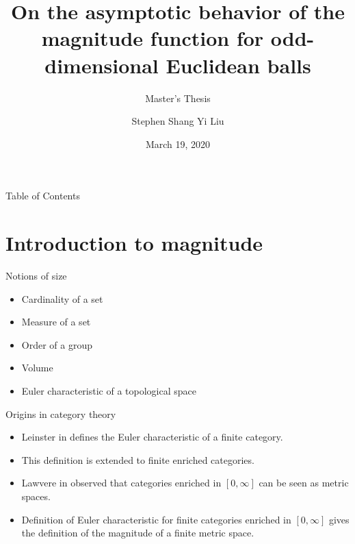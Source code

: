 \documentclass[12pt]{beamer}
\title[Magnitude of odd-dimensional Euclidean balls]{On the asymptotic behavior of the magnitude function for odd-dimensional Euclidean balls}
\subtitle{Master's Thesis}
\author %
{Stephen Shang Yi Liu}
\institute[CWRU] %
{Department of Mathematics, Applied Mathematics and Statistics\and
Case Western Reserve University}
\date{March 19, 2020} %
\begin{document}
\begin{frame}
  \titlepage
  \transboxin
\end{frame}

\begin{frame}{Table of Contents}
	\tableofcontents
\end{frame}

\section{Introduction to magnitude}

\begin{frame}{Notions of size}
\begin{itemize}
\item Cardinality of a set
\item Measure of a set
\item Order of a group
\item Volume
\item Euler characteristic of a topological space
\end{itemize}
\end{frame}

\begin{frame}{Origins in category theory}
\begin{itemize}
\item Leinster in \cite{leinster_euler_2006} defines the Euler characteristic of a finite category.
\item This definition is extended to finite enriched categories.
\item Lawvere in \cite{lawvere_metric_1973} observed that categories enriched in $[0,\infty]$ can be seen as metric spaces.
\item Definition of Euler characteristic for finite categories enriched in $[0,\infty]$ gives the definition of the magnitude of a finite metric space. 
\end{itemize}
\end{frame}
\end{document}
